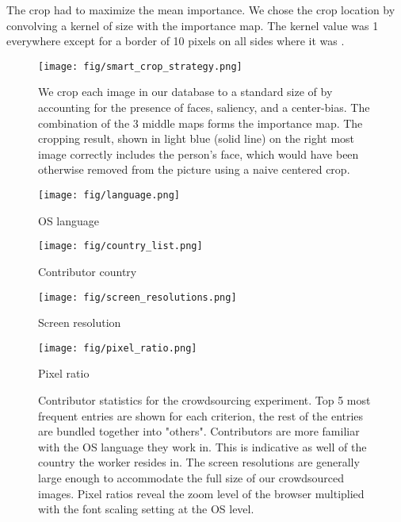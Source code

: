 \documentclass{article}
\begin{document}
The crop had to maximize the mean importance. We chose the crop location by convolving a kernel of size  with the importance map. The kernel value was 1 everywhere except for a border of  10 pixels on all sides where it was . 


\begin{figure*}[!htb]
\centering
\texttt{[image: fig/smart\_crop\_strategy.png]}
\caption{We crop each image in our database to a standard size of  by accounting for the presence of faces, saliency, and a center-bias. The combination of the 3 middle maps forms the importance map. The cropping result, shown in light blue (solid line) on the right most image correctly includes the person's face, which would have been otherwise removed from the picture using a naive centered crop.}
\label{fig:smart_crop}
\end{figure*}

\begin{figure*}[!ht]
\centering
\begin{minipage}{0.24\linewidth}
\centerline{\texttt{[image: fig/language.png]}}
\centerline{OS language}
\end{minipage}
\begin{minipage}{0.24\linewidth}
\centerline{\texttt{[image: fig/country\_list.png]}}
\centerline{Contributor country}
\end{minipage}
\begin{minipage}{0.24\linewidth}
\centerline{\texttt{[image: fig/screen\_resolutions.png]}}
\centerline{Screen resolution}
\end{minipage}
\begin{minipage}{0.24\linewidth}
\centerline{\texttt{[image: fig/pixel\_ratio.png]}}
\centerline{Pixel ratio}
\end{minipage}
\caption{Contributor statistics for the crowdsourcing experiment. Top 5 most frequent entries are shown for each criterion, the rest of the entries are bundled together into "others". Contributors are more familiar with the OS language they work in. This is indicative as well of the country the worker resides in. The screen resolutions are generally large enough to accommodate the full size of our crowdsourced images. Pixel ratios reveal the zoom level of the browser multiplied with the font scaling setting at the OS level.}
\label{fig:contributor-stats}
\end{figure*}
\end{document}
